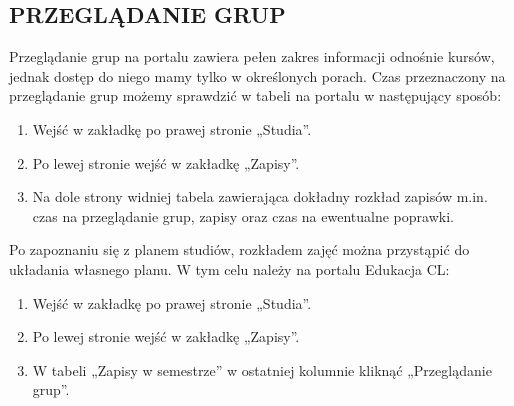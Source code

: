 \documentclass[11pt]{article}
\begin{document}
\subsection{PRZEGLĄDANIE GRUP}
\indent \hspace{0.5cm} Przeglądanie grup na portalu zawiera pełen zakres informacji odnośnie kursów, jednak dostęp do niego mamy tylko w określonych porach. Czas przeznaczony na przeglądanie grup możemy sprawdzić w tabeli na portalu w następujący sposób:
\begin{enumerate}
    \item Wejść w zakładkę po prawej stronie „Studia”.
    \item Po lewej stronie wejść w zakładkę „Zapisy”.
    \item Na dole strony widniej tabela zawierająca dokładny rozkład zapisów m.in. czas na przeglądanie grup, zapisy oraz czas na ewentualne poprawki.
\end{enumerate}
\indent \hspace{0.5cm} Po zapoznaniu się z planem studiów, rozkładem zajęć można przystąpić do układania własnego planu. W tym celu należy na portalu Edukacja CL:
\begin{enumerate}
    \item Wejść w zakładkę po prawej stronie „Studia”.
    \item Po lewej stronie wejść w zakładkę „Zapisy”.
    \item W tabeli „Zapisy w semestrze” w ostatniej kolumnie kliknąć „Przeglądanie grup”.
\end{enumerate}

\vspace{0.2cm}
\end{document}

